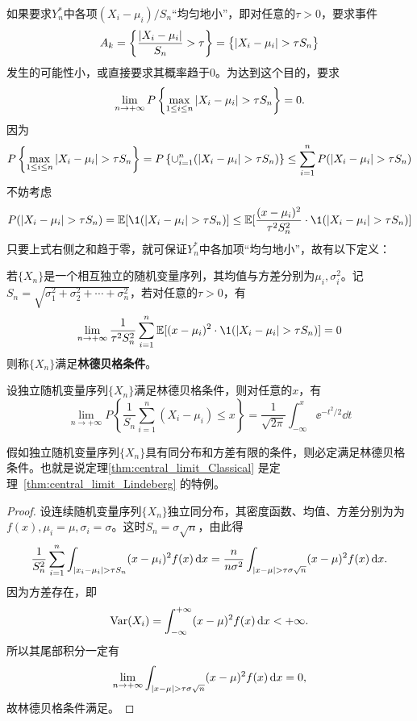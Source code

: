 如果要求$Y_n^*$中各项$(X_i - \mu_i) / S_n$“均匀地小”，即对任意的$\tau > 0$，要求事件
\[ A_k = \left\{ \frac{\left\lvert X_i - \mu_i\right\rvert}{S_n} > \tau \right\} = \bigl\{\left\lvert X_i - \mu_i\right\rvert > \tau S_n \bigr\} \]
发生的可能性小，或直接要求其概率趋于0。为达到这个目的，要求
\[ \lim_{n \to +\infty} P \left\{ \max_{1 \leq i \leq n} \left\lvert X_i - \mu_i\right\rvert > \tau S_n \right\} = 0. \]
因为
\[ P \left\{ \max_{1 \leq i \leq n} \left\lvert X_i - \mu_i\right\rvert > \tau S_n \right\} = P \left\{ \cup_{i=1}^n (\left\lvert X_i - \mu_i\right\rvert > \tau S_n) \right\} \leq \sum_{i=1}^n P(\left\lvert X_i - \mu_i\right\rvert > \tau S_n) \]
不妨考虑
\[ P(\abs{X_i - \mu_i} > \tau S_n) = \E[\1(\abs{X_i - \mu_i} > \tau S_n)] \le \E[\frac{(x - \mu_i)^2}{\tau^2 S_n^2} \cdot \1(\abs{X_i - \mu_i} > \tau S_n)] \]
只要上式右侧之和趋于零，就可保证$Y_n^*$中各加项``均匀地小''，故有以下定义：

\begin{definition}[林德贝格条件]
    若$\{ X_n \}$是一个相互独立的随机变量序列，其均值与方差分别为$\mu_i,\sigma_i^2$。记$S_n=\sqrt{\sigma_1^2 + \sigma_2^2 + \dotsb + \sigma_n^2}$，若对任意的$\tau > 0$，有
    \[ \lim_{n \to +\infty} \frac{1}{\tau^2 S_n^2} \sum_{i=1}^n \E[(x - \mu_i)^2 \cdot \1(\abs{X_i - \mu_i} > \tau S_n)] = 0 \]
    则称$\{ X_n \}$满足\textbf{林德贝格条件}。
\end{definition}

\begin{theorem}[林德贝格中心极限定理]\label{thm:central_limit_Lindeberg}
    设独立随机变量序列$\{ X_n \}$满足林德贝格条件，则对任意的$x$，有
    \[ \lim_{n \to +\infty} P \left\{ \frac1{S_n} \sum_{i=1}^n (X_i - \mu_i) \leq x \right\} = \frac1{\sqrt{2\pi}} \int_{-\infty}^x \ee^{-t^2 /2 } \dd t \]
\end{theorem}

\begin{proposition}
    假如独立随机变量序列$\{ X_n \}$具有同分布和方差有限的条件，则必定满足林德贝格条件。也就是说定理\ref{thm:central_limit_Classical} 是定理~\ref{thm:central_limit_Lindeberg} 的特例。
\end{proposition}
\begin{proof}
    设连续随机变量序列$\{ X_n \}$独立同分布，其密度函数、均值、方差分别为为$f(x),\mu_i = \mu ,\sigma_i = \sigma$。这时$S_n = \sigma \sqrt{n}$，由此得
    \[ \frac{1}{S_n^2} \sum_{i=1}^n \int_{\left\lvert x_i - \mu_i\right\rvert > \tau S_n} (x - \mu_i)^2 f(x) \mathop{}\!\mathrm d x = \frac{n}{n \sigma^2} \int_{\left\lvert x - \mu\right\rvert > \tau \sigma \sqrt{n}} (x - \mu)^2 f(x) \mathop{}\!\mathrm d x. \]
    因为方差存在，即
    \[ \operatorname{Var}(X_i) = \int_{-\infty}^{+\infty} (x - \mu)^2 f(x) \mathop{}\!\mathrm d x < + \infty. \]
    所以其尾部积分一定有
    \[ \lim_{n \to +\infty} \int_{\left\lvert x - \mu\right\rvert > \tau \sigma \sqrt{n}} (x - \mu)^2 f(x) \mathop{}\!\mathrm d x = 0, \]
    故林德贝格条件满足。
\end{proof}

